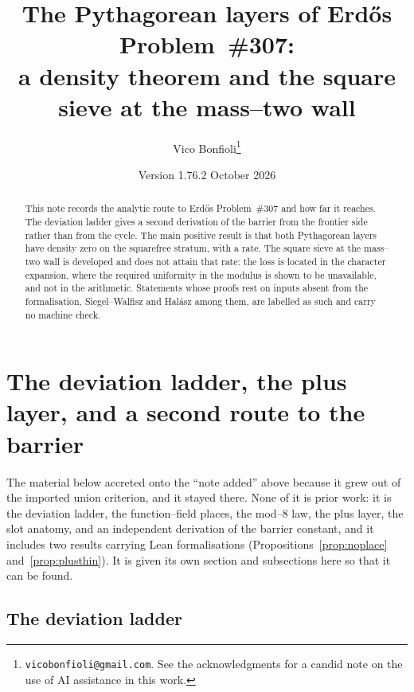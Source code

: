 \documentclass[11pt]{article}
\title{The Pythagorean layers of Erd\H{o}s Problem~\#307:\\ a density theorem and the square sieve at the mass--two wall}
\author{Vico Bonfioli\thanks{\texttt{vicobonfioli@gmail.com}.
  See the acknowledgments for a candid note on the use of AI assistance in this work.}}
\date{Version 1.76.2\quad 18 October 2026}
\theoremstyle{definition}
\begin{document}
\maketitle

\begin{abstract}
This note records the analytic route to Erd\H{o}s Problem~\#307 and how far it reaches. The
deviation ladder gives a second derivation of the barrier from the frontier side rather than from
the cycle. The main positive result is that both Pythagorean layers have density zero on the
squarefree stratum, with a rate. The square sieve at the mass--two wall is developed and does not
attain that rate: the loss is located in the character expansion, where the required uniformity in
the modulus is shown to be unavailable, and not in the arithmetic. Statements whose proofs rest on
inputs absent from the formalisation, Siegel--Walfisz and Hal\'asz among them, are labelled as such
and carry no machine check.
\end{abstract}
\section{The deviation ladder, the plus layer, and a second route to the barrier}\label{sec:ladderplus}

The material below accreted onto the ``note added'' above because it grew out of the imported
union criterion, and it stayed there. None of it is prior work: it is the deviation ladder, the
function--field places, the mod--$8$ law, the plus layer, the slot anatomy, and an independent
derivation of the barrier constant, and it includes two results carrying Lean formalisations
(Propositions~\ref{prop:noplace} and~\ref{prop:plusthin}). It is given its own section and
subsections here so that it can be found.

\subsection{The deviation ladder}\label{ssec:ladder}
\end{document}
